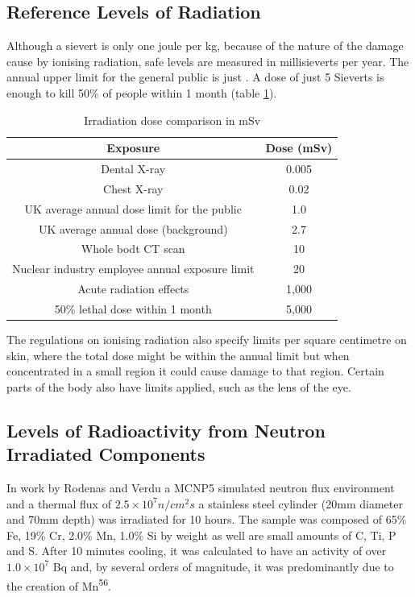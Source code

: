 \subsection{Reference Levels of Radiation}

Although a sievert is only one joule per kg, because of the nature of the damage cause by ionising radiation, safe levels are measured in millisieverts per year.  The annual upper limit for the general public is just .  A dose of just 5 Sieverts is enough to kill 50\% of people within 1 month (table \ref{table:dosecomparison}). 

\begin{table}[h]
\begin{center}
\renewcommand{\arraystretch}{1.2}
\begin{tabular}{c c}
\hline\hline
Exposure & Dose (mSv) \\
\hline\hline
Dental X-ray & 0.005 \\
Chest X-ray & 0.02 \\
UK average annual dose limit for the public &  1.0 \\
UK average annual dose (background) &  2.7 \\
Whole bodt CT scan & 10 \\
Nuclear industry employee annual exposure limit & 20 \\
Acute radiation effects & 1,000 \\
50\% lethal dose within 1 month & 5,000 \\
\hline\hline
\end{tabular}
\end{center}
\caption{Irradiation dose comparison in mSv}
\label{table:dosecomparison}
\end{table}

The regulations on ionising radiation\cite{ionisingradiationregulations} also specify limits per square centimetre on skin, where the total dose might be within the annual limit but when concentrated in a small region it could cause damage to that region.  Certain parts of the body also have limits applied, such as the lens of the eye.

\subsection{Levels of Radioactivity from Neutron Irradiated Components}

In work by Rodenas and Verdu a MCNP5 simulated neutron flux environment and a thermal flux of $2.5 \times 10^7 n/cm^2 s$ a stainless steel cylinder (20mm diameter and 70mm depth) was irradiated for 10 hours\cite{radionuclides}.  The sample was composed of 65\% Fe, 19\% Cr, 2.0\% Mn, 1.0\% Si by weight as well are small amounts of C, Ti, P and S.  After 10 minutes cooling, it was calculated to have an activity of over $1.0 \times 10^7$ Bq and, by several orders of magnitude, it was predominantly due to the creation of Mn\textsuperscript{56}.  

